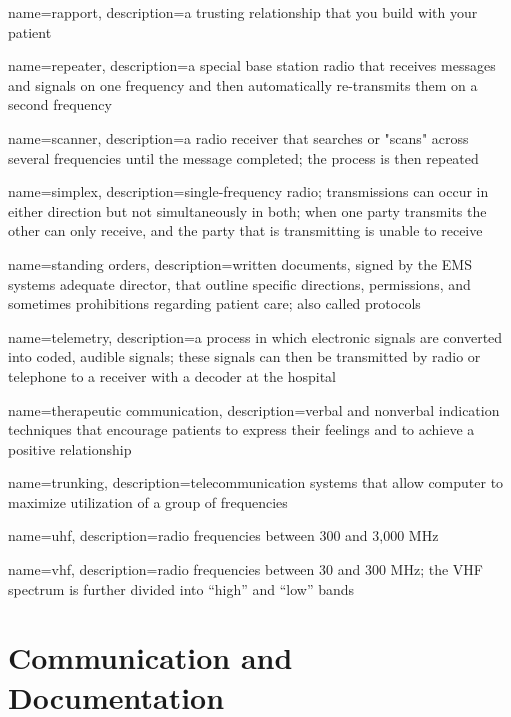 \documentclass[../../EMT-169.tex]{subfiles}
\begin{document}
	{
		name=rapport,
		description={a trusting relationship that you build with your patient}
	}
	
	{
		name=repeater,
		description={a special base station radio that receives messages and signals on one frequency and then automatically re-transmits them on a second frequency}
	}
	
	{
		name=scanner,
		description={a radio receiver that searches or "scans" across several frequencies until the message completed; the process is then repeated}
	}
	
	{
		name=simplex,
		description={single-frequency radio; transmissions can occur in either direction but not simultaneously in both; when one party transmits the other can only receive, and the party that is transmitting is unable to receive}
	}
	
	{
		name=standing orders,
		description={written documents, signed by the EMS systems adequate director, that outline specific directions, permissions, and sometimes prohibitions regarding patient care; also called protocols}
	}
	
	{
		name=telemetry,
		description={a process in which electronic signals are converted into coded, audible signals; these signals can then be transmitted by radio or telephone to a receiver with a decoder at the hospital}
	}
	
	{
		name=therapeutic communication,
		description={verbal and nonverbal indication techniques that encourage patients to express their feelings and to achieve a positive relationship}
	}
	
	{
		name=trunking,
		description={telecommunication systems that allow computer to maximize utilization of a group of frequencies}
	}
	
	{
		name=\acrfull{uhf},
		description={radio frequencies between 300 and 3,000 MHz}
	}
	
	{
		name=\acrfull{vhf},
		description={radio frequencies between 30 and 300 MHz; the VHF spectrum is further divided into “high” and “low” bands}
	}


\chapter{Communication and Documentation}
\end{document}
